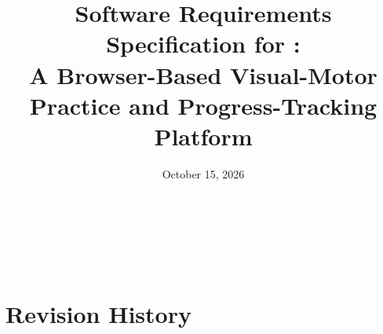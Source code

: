 \documentclass[12pt]{article}
\renewcommand{\_}{\textunderscore\allowbreak}%
\begin{document}
\title{Software Requirements Specification for \progname:\\ A Browser-Based Visual-Motor Practice and Progress-Tracking Platform}
\author{\authname}
\date{October 15, 2026}
	
\maketitle

~\newpage


\tableofcontents

~\newpage

\section*{Revision History}
\end{document}
